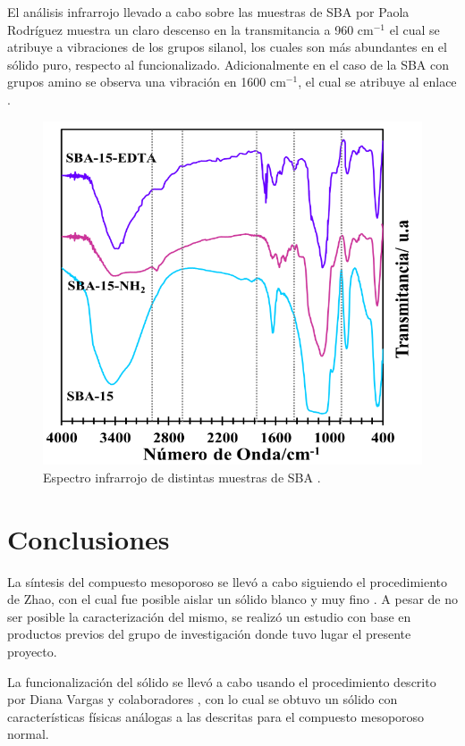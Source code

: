 \documentclass[fleqn, 12pt]{SelfArx}
\begin{document}
El an\'alisis infrarrojo llevado a cabo sobre las muestras de SBA por Paola Rodr\'iguez muestra un claro descenso en la transmitancia a 960 cm$^{-1}$ el cual se atribuye a vibraciones de los grupos silanol, los cuales son m\'as abundantes en el s\'olido puro, respecto al funcionalizado. Adicionalmente en el caso de la SBA con grupos amino se observa una vibraci\'on en 1600 cm$^{-1}$, el cual se atribuye al enlace  \cite{rodriguez}\cite{li_guo_shi_2010}\cite{melendez_murillo_ramirez_2016}.
\begin{figure}[h]
	\centering
	\includegraphics[width=0.8\linewidth]{structures/IR.png}
	\caption{Espectro infrarrojo de distintas muestras de SBA \cite{rodriguez}.}
\end{figure}

\section{Conclusiones}
La s\'intesis del compuesto mesoporoso se llev\'o a cabo siguiendo el procedimiento de Zhao, con el cual fue posible aislar un s\'olido blanco y muy fino \cite{zhao_1998}. A pesar de no ser posible la caracterizaci\'on del mismo, se realiz\'o un estudio con base en productos previos del grupo de investigaci\'on donde tuvo lugar el presente proyecto.
 
La funcionalizaci\'on del s\'olido se llev\'o a cabo usando el procedimiento descrito por Diana Vargas y colaboradores \cite{vargas_legnoverde_giraldo_basaldella_moreno-pirajan_2010}, con lo cual se obtuvo un s\'olido con caracter\'isticas f\'isicas an\'alogas a las descritas para el compuesto mesoporoso normal.
\end{document}
